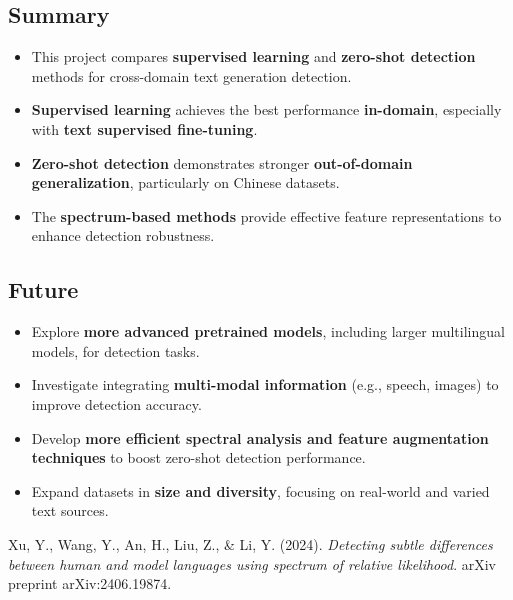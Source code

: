 \documentclass[lettersize,journal]{IEEEtran}
\begin{document}
\subsection{Summary}
\begin{itemize}
  \item This project compares \textbf{supervised learning} and \textbf{zero-shot detection} methods for cross-domain text generation detection.
  \item \textbf{Supervised learning} achieves the best performance \textbf{in-domain}, especially with \textbf{text supervised fine-tuning}.
  \item \textbf{Zero-shot detection} demonstrates stronger \textbf{out-of-domain generalization}, particularly on Chinese datasets.
  \item The \textbf{spectrum-based methods} provide effective feature representations to enhance detection robustness.
\end{itemize}
\subsection{Future}
\begin{itemize}
  \item Explore \textbf{more advanced pretrained models}, including larger multilingual models, for detection tasks.
  \item Investigate integrating \textbf{multi-modal information} (e.g., speech, images) to improve detection accuracy.
  \item Develop \textbf{more efficient spectral analysis and feature augmentation techniques} to boost zero-shot detection performance.
  \item Expand datasets in \textbf{size and diversity}, focusing on real-world and varied text sources.
\end{itemize}


\renewcommand{\refname}{References}  %

\begin{thebibliography}{2}
Xu, Y., Wang, Y., An, H., Liu, Z., \& Li, Y. (2024). 
\textit{Detecting subtle differences between human and model languages using spectrum of relative likelihood}. 
arXiv preprint arXiv:2406.19874.
\end{thebibliography}
\end{document}
